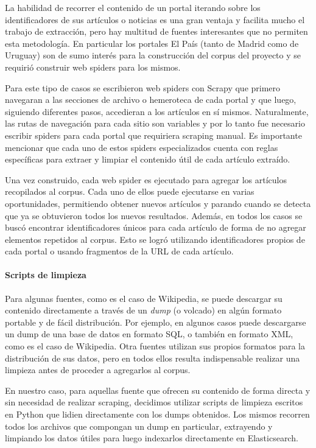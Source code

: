La habilidad de recorrer el contenido de un portal iterando sobre los identificadores de sus artículos
o noticias es una gran ventaja y facilita mucho el trabajo de extracción, pero hay multitud de fuentes
interesantes que no permiten esta metodología. En particular los portales El País (tanto de Madrid
como de Uruguay) son de sumo interés para la construcción del corpus del proyecto y se requirió
construir web spiders para los mismos.

Para este tipo de casos se escribieron web spiders con Scrapy que primero navegaran a las
secciones de archivo o hemeroteca de cada portal y que luego, siguiendo diferentes pasos,
accedieran a los artículos en sí mismos. Naturalmente, las rutas de navegación para cada sitio
son variables y por lo tanto fue necesario escribir spiders para cada portal que requiriera
scraping manual. Es importante mencionar que cada uno de estos spiders especializados cuenta
con reglas específicas para extraer y limpiar el contenido útil de cada artículo extraído.

Una vez construido, cada web spider es ejecutado para agregar los artículos recopilados al corpus.
Cada uno de ellos puede ejecutarse en varias oportunidades, permitiendo obtener nuevos artículos y
parando cuando se detecta que ya se obtuvieron todos los nuevos resultados. Además, en todos
los casos se buscó encontrar identificadores únicos para cada artículo de forma de no agregar
elementos repetidos al corpus. Esto se logró utilizando identificadores propios de cada portal o usando
fragmentos de la URL de cada artículo.

\paragraph{Scripts de limpieza}

Para algunas fuentes, como es el caso de Wikipedia, se puede descargar su contenido directamente
a través de un \textit{dump} (o volcado) en algún formato portable y de fácil distribución. Por ejemplo,
en algunos casos puede descargarse un dump de una base de datos en formato SQL, o también en
formato XML, como es el caso de Wikipedia. Otra fuentes utilizan sus propios formatos para la
distribución de sus datos, pero en todos ellos resulta indispensable realizar una limpieza antes
de proceder a agregarlos al corpus.

En nuestro caso, para aquellas fuente que ofrecen su contenido de forma directa y sin necesidad
de realizar scraping, decidimos utilizar scripts de limpieza escritos en Python que lidien directamente
con los dumps obtenidos. Los mismos recorren todos los archivos que compongan un dump en
particular, extrayendo y limpiando los datos útiles para luego indexarlos directamente en Elasticsearch.

